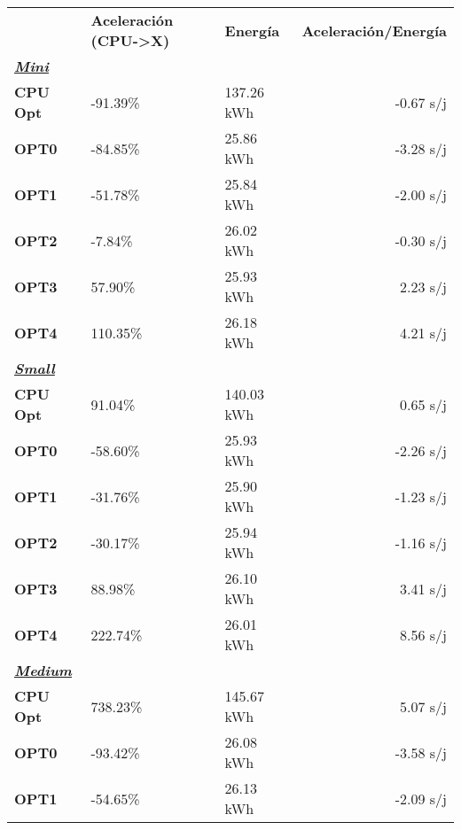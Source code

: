 \begin{table}[H]
    \centering
    \begin{tabular}{lllr}
    \rowcolor[HTML]{DAE8FC} \ & \textbf{Aceleración (CPU->X)} & \textbf{	Energía} & \textbf{	Aceleración/Energía} \\
    \cellcolor[HTML]{DAE8FC} \textbf{\textbf{{\emph{{\underline{{Mini}}}}}}} & &	&	 \\
    \rowcolor[HTML]{EFEFEF} \cellcolor[HTML]{DAE8FC} \textbf{CPU Opt} &-91.39\%  &	137.26 kWh  &	-0.67 s/j \\
    \cellcolor[HTML]{DAE8FC} \textbf{OPT0} & -84.85\%  &	25.86 kWh  &	-3.28 s/j \\
    \rowcolor[HTML]{EFEFEF} \cellcolor[HTML]{DAE8FC} \textbf{OPT1} &-51.78\%  &	25.84 kWh  &	-2.00 s/j \\
    \cellcolor[HTML]{DAE8FC} \textbf{OPT2} & -7.84\%  &	26.02 kWh  &	-0.30 s/j \\
    \rowcolor[HTML]{EFEFEF} \cellcolor[HTML]{DAE8FC} \textbf{OPT3} &57.90\%  &	25.93 kWh  &	2.23 s/j \\
    \cellcolor[HTML]{DAE8FC} \textbf{OPT4} & 110.35\%  &	26.18 kWh  &	4.21 s/j \\
    \rowcolor[HTML]{EFEFEF} \cellcolor[HTML]{DAE8FC} \textbf{\textbf{{\emph{{\underline{{Small}}}}}}} &&	&	 \\
    \cellcolor[HTML]{DAE8FC} \textbf{CPU Opt} & 91.04\%  &	140.03 kWh  &	0.65 s/j \\
    \rowcolor[HTML]{EFEFEF} \cellcolor[HTML]{DAE8FC} \textbf{OPT0} &-58.60\%  &	25.93 kWh  &	-2.26 s/j \\
    \cellcolor[HTML]{DAE8FC} \textbf{OPT1} & -31.76\%  &	25.90 kWh  &	-1.23 s/j \\
    \rowcolor[HTML]{EFEFEF} \cellcolor[HTML]{DAE8FC} \textbf{OPT2} &-30.17\%  &	25.94 kWh  &	-1.16 s/j \\
    \cellcolor[HTML]{DAE8FC} \textbf{OPT3} & 88.98\%  &	26.10 kWh  &	3.41 s/j \\
    \rowcolor[HTML]{EFEFEF} \cellcolor[HTML]{DAE8FC} \textbf{OPT4} &222.74\%  &	26.01 kWh  &	8.56 s/j \\
    \cellcolor[HTML]{DAE8FC} \textbf{\textbf{{\emph{{\underline{{Medium}}}}}}} & &	&	 \\
    \rowcolor[HTML]{EFEFEF} \cellcolor[HTML]{DAE8FC} \textbf{CPU Opt} &738.23\%  &	145.67 kWh  &	5.07 s/j \\
    \cellcolor[HTML]{DAE8FC} \textbf{OPT0} & -93.42\%  &	26.08 kWh  &	-3.58 s/j \\
    \rowcolor[HTML]{EFEFEF} \cellcolor[HTML]{DAE8FC} \textbf{OPT1} &-54.65\%  &	26.13 kWh  &	-2.09 s/j \\

\end{tabular}
\end{table}
